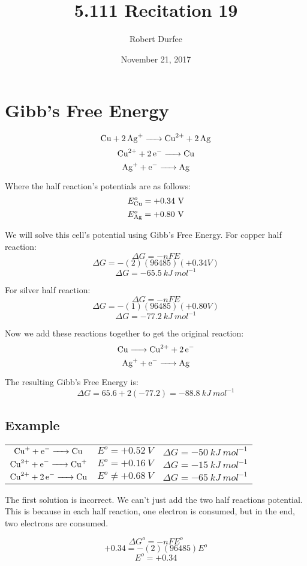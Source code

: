 \documentclass{article}
\title{ 5.111 Recitation 19 }
\author{ Robert Durfee }
\date{ November 21, 2017 }
\begin{document}
\maketitle

\section{Gibb's Free Energy }
$$\ce{Cu + 2 Ag+ -> Cu^{2+} + 2 Ag}$$
$$\ce{Cu^{2+} + 2e- -> Cu}$$
$$\ce{Ag+ + e- -> Ag}$$

Where the half reaction's potentials are as follows:
$$E^o_{\ce{Cu}} = +0.34\ \si{V}$$
$$E^o_{\ce{Ag}} = +0.80\ \si{V}$$

We will solve this cell's potential using Gibb's Free Energy. For copper half
reaction:
$$\Delta G = -nFE$$
$$\Delta G = -(2)(96485)(+0.34 V)$$
$$\Delta G = -65.5\ \si{kJ\ mol^{-1}}$$

For silver half reaction:
$$\Delta G = -nFE$$
$$\Delta G = -(1)(96485)(+0.80 V)$$
$$\Delta G = -77.2\ \si{kJ\ mol^{-1}}$$

Now we add these reactions together to get the original reaction:
$$\ce{Cu -> Cu^{2+} + 2e-}$$
$$\ce{Ag+ + e- -> Ag}$$

The resulting Gibb's Free Energy is:
$$\Delta G = 65.6 + 2(-77.2) = -88.8\ \si{kJ\ mol^{-1}}$$

\subsection{Example}

\begin{center}
    \begin{tabular}{c c c}
        $\ce{Cu+ + e- -> Cu}$ & $E^o = +0.52\ \si{V}$ & $\Delta G = -50\ \si{kJ\
        mol^{-1}}$ \\
        $\ce{Cu^{2+} + e- -> Cu+}$ & $E^o = +0.16\ \si{V}$ & $\Delta G = -15\
        \si{kJ\ mol^{-1}}$ \\
        $\ce{Cu^{2+} + 2e- -> Cu}$ & $E^o \neq +0.68\ \si{V}$ & $\Delta G = -65\
        \si{kJ\ mol^{-1}}$
    \end{tabular}
\end{center}

The first solution is incorrect. We can't just add the two half reactions
potential. This is because in each half reaction, one electron is consumed, but
in the end, two electrons are consumed. 

$$\Delta G^o = -nFE^o$$
$$+0.34 = -(2)(96485)E^o$$
$$E^o = +0.34$$
\end{document}
